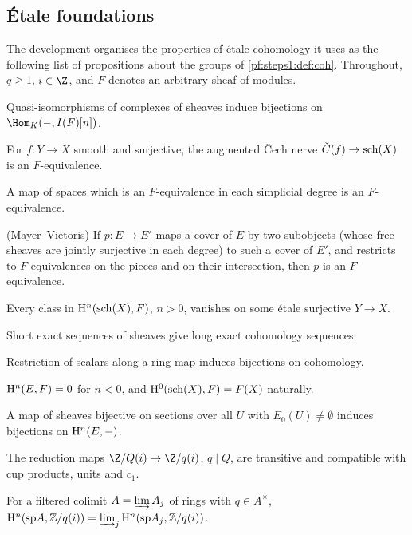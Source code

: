 \subsection{\'Etale foundations}\label{sec:pf:steps1:etale}

\begin{definition}\label{pf:steps1:def:axioms}
The development organises the properties of \'etale cohomology it uses as the following list of
propositions about the groups of \cref{pf:steps1:def:coh}. Throughout, $q\ge1$, $i\in\Z$, and $F$ denotes an
arbitrary sheaf of modules.
\begin{description}[nosep,leftmargin=2.6em,style=sameline]
\item[A1] Quasi-isomorphisms of complexes of sheaves induce bijections on $\Hom_{K}(-,I(F)[n])$.
\item[A2] For $f\colon Y\to X$ smooth and surjective, the augmented \v{C}ech nerve
  $\check C(f)\to\mathrm{sch}(X)$ is an $F$-equivalence.
\item[A3] A map of spaces which is an $F$-equivalence in each simplicial degree is an $F$-equivalence.
\item[A4] (Mayer--Vietoris) If $p\colon E\to E'$ maps a cover of $E$ by two subobjects (whose free sheaves
  are jointly surjective in each degree) to such a cover of $E'$, and restricts to $F$-equivalences on the
  pieces and on their intersection, then $p$ is an $F$-equivalence.
\item[A5] Every class in $\mathrm{H}^n(\mathrm{sch}(X),F)$, $n>0$, vanishes on some \'etale surjective $Y\to X$.
\item[A7] Short exact sequences of sheaves give long exact cohomology sequences.
\item[A8] Restriction of scalars along a ring map induces bijections on cohomology.
\item[A9] $\mathrm{H}^n(E,F)=0$ for $n<0$, and $\mathrm{H}^0(\mathrm{sch}(X),F)=F(X)$ naturally.
\item[A10] A map of sheaves bijective on sections over all $U$ with $E_0(U)\neq\emptyset$ induces
  bijections on $\mathrm{H}^n(E,-)$.
\item[A11] The reduction maps $\Z/Q(i)\to\Z/q(i)$, $q\mid Q$, are transitive and compatible with cup
  products, units and $c_1$.
\item[B1] For a filtered colimit $A=\varinjlim A_j$ of rings with $q\in A^\times$,
  $\mathrm{H}^n(\mathrm{sp} A,\mathbb{Z}/q(i))=\varinjlim_j\mathrm{H}^n(\mathrm{sp} A_j,\mathbb{Z}/q(i))$.

\end{description}
\end{definition}
